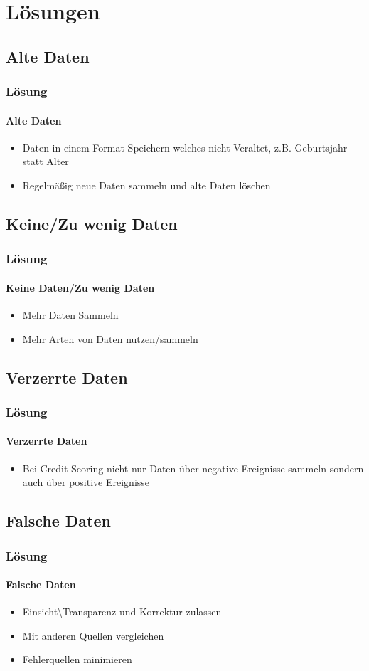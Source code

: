 \section{Lösungen}
\subsection{Alte Daten}
\begin{frame}
\frametitle{Lösung}
\framesubtitle{Alte Daten}
\begin{itemize}[<+(1)->]
	\item Daten in einem Format Speichern welches nicht Veraltet, z.B. Geburtsjahr statt Alter
	\item Regelmäßig neue Daten sammeln und alte Daten löschen
\end{itemize}
\end{frame}

\subsection{Keine/Zu wenig Daten}
\begin{frame}
\frametitle{Lösung}
\framesubtitle{Keine Daten/Zu wenig Daten}
\begin{itemize}[<+(1)->]
	\item Mehr Daten Sammeln
	\item Mehr Arten von Daten nutzen/sammeln
\end{itemize}
\end{frame}

\subsection{Verzerrte Daten}
\begin{frame}
\frametitle{Lösung}
\framesubtitle{Verzerrte Daten}
\begin{itemize}[<+(1)->]
\item Bei Credit-Scoring nicht nur Daten über negative Ereignisse sammeln sondern auch über positive Ereignisse 
\end{itemize}
\end{frame}

\subsection{Falsche Daten}
\begin{frame}
\frametitle{Lösung}
\framesubtitle{Falsche Daten}
\begin{itemize}[<+(1)->]
	\item Einsicht\textbackslash Transparenz und Korrektur zulassen 
	\item Mit anderen Quellen vergleichen
	\item Fehlerquellen minimieren
\end{itemize}
\end{frame}


